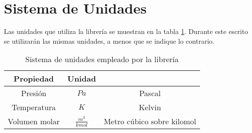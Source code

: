 \section{Sistema de Unidades}\label{sec:units}

Las unidades que utiliza la librería se muestran en la tabla \ref{tab:units}.
Durante este escrito se utilizarán las mismas unidades, a menos que se indique lo contrario.


\begin{table}[!h]
	\centering
	\caption{Sistema de unidades empleado por la librería}\label{tab:units}
	\begin{tabular}{ |c| c|c|}
		\hline
			Propiedad & Unidad &\\
		\hline
			Presión & $Pa$ & Pascal\\
			Temperatura & $K$ & Kelvin\\
			Volumen molar & $\frac{m^3}{kmol}$ & Metro cúbico sobre kilomol\\

		\hline
	\end{tabular}
\end{table}